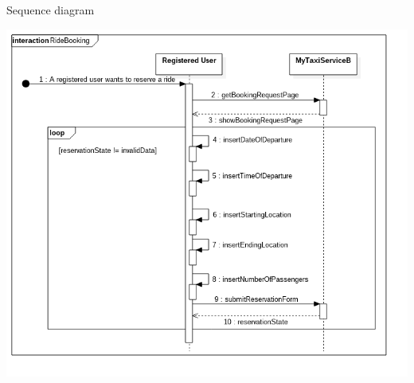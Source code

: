 \documentclass[11pt,titlepage]{article} %
\begin{document}
\begin{enumerate}
\begin{description}
		\end{description}
		Sequence diagram
		\begin{center}
		\includegraphics[scale=0.52]{usecase2.png}
		\end{center}


\end{enumerate}
\end{document}
